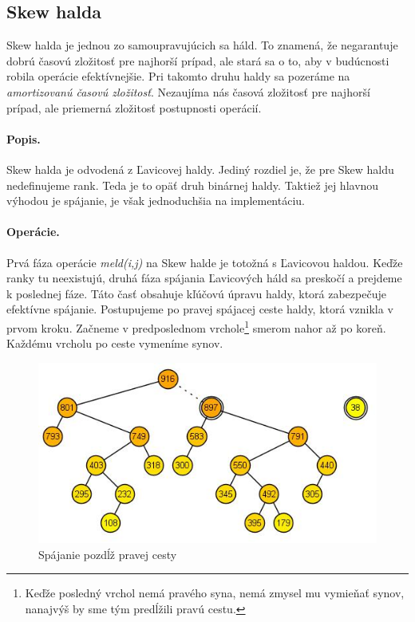 \subsection{Skew halda} 
Skew halda je jednou zo samoupravujúcich sa háld. To znamená, že negarantuje dobrú časovú zložitosť pre najhorší prípad, ale stará 
sa o to, aby v budúcnosti robila operácie efektívnejšie. Pri takomto druhu haldy sa pozeráme na \emph{amortizovanú časovú 
zložitosť}. Nezaujíma nás časová zložitosť pre najhorší prípad, ale priemerná zložitosť postupnosti operácií.

\paragraph{Popis.}
Skew halda je odvodená z Ľavicovej haldy. Jediný rozdiel je, že pre Skew haldu nedefinujeme rank. Teda je to opäť druh binárnej 
haldy. Taktiež jej hlavnou výhodou je spájanie, je však jednoduchšia na implementáciu.


\paragraph{Operácie.}
Prvá fáza operácie \emph{meld(i,j)} na Skew halde je totožná s Ľavicovou haldou. Keďže ranky tu neexistujú, druhá fáza spájania 
Ľavicových háld sa preskočí a prejdeme k poslednej fáze. Táto časť obsahuje kľúčovú úpravu haldy, ktorá zabezpečuje efektívne 
spájanie. Postupujeme po pravej spájacej ceste haldy, ktorá vznikla v prvom kroku. Začneme v predposlednom vrchole\footnote{Keďže posledný vrchol nemá pravého syna, nemá zmysel mu vymieňať synov, nanajvýš by sme tým predĺžili pravú cestu.} smerom nahor až po koreň. Každému vrcholu po ceste vymeníme synov.


\begin{figure}
\includegraphics[width=\columnwidth]{obrazky/skewinsert.png}
\caption{\emph{} 
Spájanie pozdĺž pravej cesty} 
\label{img:skew} 
\end{figure}

